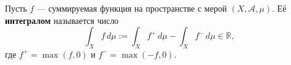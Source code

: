 \label{definition:26}

\begin{definition}
Пусть $f$ --- суммируемая функция на пространстве с мерой $(X,\mathcal A,\mu)$.
Её \textbf{интегралом} называется число
\[
  \int_X f\,d\mu:=\int_X f^+\,d\mu-\int_X f^-\,d\mu\in\mathbb R,
\]
где $f^+=\max(f,0)$ и $f^-=\max(-f,0)$.
\end{definition}
